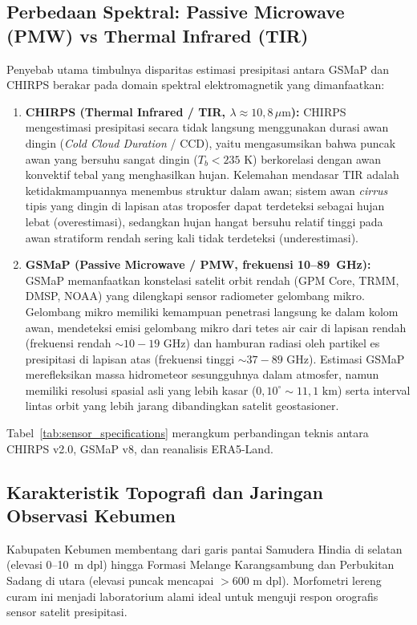 \documentclass[11pt,a4paper,titlepage]{article}
\begin{document}
\subsection{Perbedaan Spektral: Passive Microwave (PMW) vs Thermal Infrared (TIR)}
Penyebab utama timbulnya disparitas estimasi presipitasi antara GSMaP dan CHIRPS berakar pada domain spektral elektromagnetik yang dimanfaatkan:
\begin{enumerate}
    \item \textbf{CHIRPS (Thermal Infrared / TIR, $\lambda \approx 10,8\,\mu\text{m}$):} CHIRPS mengestimasi presipitasi secara tidak langsung menggunakan durasi awan dingin (\textit{Cold Cloud Duration} / CCD), yaitu mengasumsikan bahwa puncak awan yang bersuhu sangat dingin ($T_b < 235\text{ K}$) berkorelasi dengan awan konvektif tebal yang menghasilkan hujan. Kelemahan mendasar TIR adalah ketidakmampuannya menembus struktur dalam awan; sistem awan \textit{cirrus} tipis yang dingin di lapisan atas troposfer dapat terdeteksi sebagai hujan lebat (overestimasi), sedangkan hujan hangat bersuhu relatif tinggi pada awan stratiform rendah sering kali tidak terdeteksi (underestimasi).
    \item \textbf{GSMaP (Passive Microwave / PMW, frekuensi 10--89~GHz):} GSMaP memanfaatkan konstelasi satelit orbit rendah (GPM Core, TRMM, DMSP, NOAA) yang dilengkapi sensor radiometer gelombang mikro. Gelombang mikro memiliki kemampuan penetrasi langsung ke dalam kolom awan, mendeteksi emisi gelombang mikro dari tetes air cair di lapisan rendah (frekuensi rendah $\sim 10-19\text{ GHz}$) dan hamburan radiasi oleh partikel es presipitasi di lapisan atas (frekuensi tinggi $\sim 37-89\text{ GHz}$). Estimasi GSMaP merefleksikan massa hidrometeor sesungguhnya dalam atmosfer, namun memiliki resolusi spasial asli yang lebih kasar ($0,10^\circ \sim 11,1\text{ km}$) serta interval lintas orbit yang lebih jarang dibandingkan satelit geostasioner.
\end{enumerate}

Tabel~\ref{tab:sensor_specifications} merangkum perbandingan teknis antara CHIRPS v2.0, GSMaP v8, dan reanalisis ERA5-Land.



\subsection{Karakteristik Topografi dan Jaringan Observasi Kebumen}
Kabupaten Kebumen membentang dari garis pantai Samudera Hindia di selatan (elevasi 0--10~m dpl) hingga Formasi Melange Karangsambung dan Perbukitan Sadang di utara (elevasi puncak mencapai $>600\text{ m}$ dpl). Morfometri lereng curam ini menjadi laboratorium alami ideal untuk menguji respon orografis sensor satelit presipitasi.
\end{document}
